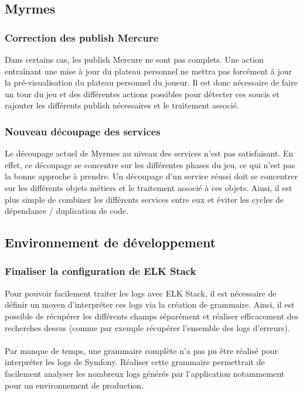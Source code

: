 \documentclass{article}
\begin{document}
        \subsection{Myrmes}

            \subsubsection{Correction des publish Mercure}

                Dans certains cas, les publish Mercure ne sont pas complets. Une action entraînant une mise à jour du plateau personnel ne mettra pas forcément à jour la pré-visualisation du plateau personnel du joueur. Il est donc nécessaire de faire un tour du jeu et des différentes actions possibles pour détecter ces soucis et rajouter les différents publish nécessaires et le traitement associé.

            \subsubsection{Nouveau découpage des services}

                Le découpage actuel de Myrmes au niveau des services n'est pas satisfaisant. En effet, ce découpage se concentre sur les différentes phases du jeu, ce qui n'est pas la bonne approche à prendre. Un découpage d'un service réussi doit se concentrer sur les différents objets métiers et le traitement associé à ces objets. Ainsi, il est plus simple de combiner les différents services entre eux et éviter les cycles de dépendance / duplication de code.

        \subsection{Environnement de développement}

            \subsubsection{Finaliser la configuration de ELK Stack}

                Pour pouvoir facilement traiter les logs avec ELK Stack, il est nécessaire de définir un moyen d'interpréter ces logs via la création de grammaire. Ainsi, il est possible de récupérer les différents champs séparément et réaliser efficacement des recherches dessus (comme par exemple récupérer l'ensemble des logs d'erreurs).\\
                \\
                \indent Par manque de temps, une grammaire complète n'a pas pu être réalisé pour interpréter les logs de Symfony. Réaliser cette grammaire permettrait de facilement analyser les nombreux logs générés par l'application notammement pour un environnement de production.
\end{document}
